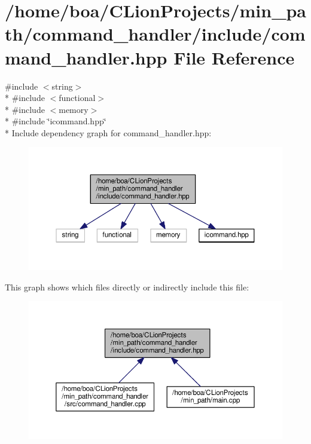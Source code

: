 \hypertarget{a00018}{}\section{/home/boa/\+C\+Lion\+Projects/min\+\_\+path/command\+\_\+handler/include/command\+\_\+handler.hpp File Reference}
\label{a00018}
{\ttfamily \#include $<$string$>$}\\*
{\ttfamily \#include $<$functional$>$}\\*
{\ttfamily \#include $<$memory$>$}\\*
{\ttfamily \#include \char`\"{}icommand.\+hpp\char`\"{}}\\*
Include dependency graph for command\+\_\+handler.\+hpp\+:
\nopagebreak
\begin{figure}[H]
\begin{center}
\leavevmode
\includegraphics[width=350pt]{d5/df9/a00044}
\end{center}
\end{figure}
This graph shows which files directly or indirectly include this file\+:
\nopagebreak
\begin{figure}[H]
\begin{center}
\leavevmode
\includegraphics[width=350pt]{d6/d97/a00045}
\end{center}
\end{figure}

